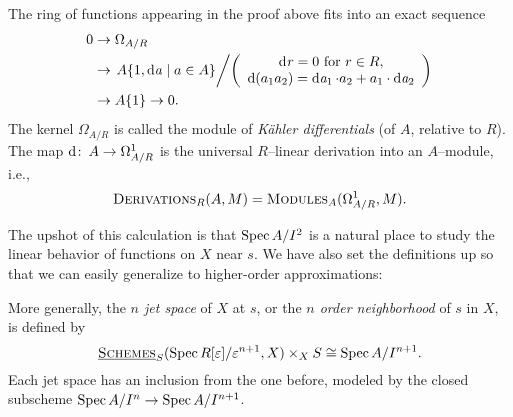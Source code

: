 \begin{definition}
The ring of functions appearing in the proof above fits into an exact sequence
\begin{align*}
0 & \to \Omega_{A/R} \\
& \to \left. A\{1, \operatorname{d\mathit{a}} \mid a \in A\} \middle/ \left( \begin{array}{c} \text{\(\operatorname{d\mathit{r}} = 0\) for \(r \in R\)}, \\ \operatorname{d}(a_1 a_2) = \operatorname{d\mathit{a}_1} \cdot a_2 + a_1 \cdot \operatorname{d\mathit{a}_2} \end{array} \right) \right. \\
& \to A\{1\} \to 0.
\end{align*}
The kernel \(\Omega_{A/R}\) is called the module of \textit{K\"ahler differentials} (of \(A\), relative to \(R\)).  The map \(\operatorname d\colon\thinspace A\to \Omega^1_{A/R}\) is the universal \(R\)--linear derivation into an \(A\)--module, i.e., \[\normalfont\textsc{Derivations}_R(A, M) = \normalfont\textsc{Modules}_A(\Omega^1_{A/R}, M).\]
\end{definition}

The upshot of this calculation is that \(\operatorname{Spec} A/I^2\) is a natural place to study the linear behavior of functions on \(X\) near \(s\).  We have also set the definitions up so that we can easily generalize to higher-order approximations:
\begin{definition}\label{JetSpacesDefn}
More generally, the \textit{\(n\){\th} jet space} of \(X\) at \(s\), or the \textit{\(n\){\th} order neighborhood} of \(s\) in \(X\), is defined by \[\operatorname{\underline{\smash{\normalfont\textsc{Schemes}}}}_S(\operatorname{Spec} R[\varepsilon] / \varepsilon^{n+1}, X) \times_X S \cong \operatorname{Spec} A / I^{n+1}.\]  Each jet space has an inclusion from the one before, modeled by the closed subscheme \(\operatorname{Spec} A/I^n \to \operatorname{Spec} A / I^{n+1}\).
\end{definition}

